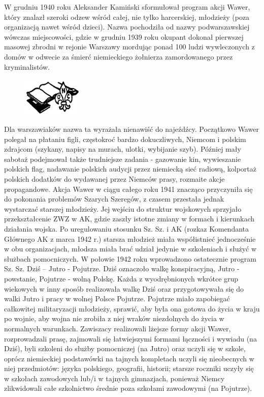 W grudniu 1940 roku Aleksander Kamiński sformułował program akcji Wawer, który znalazł szeroki odzew wśród całej, nie tylko harcerskiej, młodzieży (poza organizacją nawet wśród dzieci). 
Nazwa pochodziła od nazwy podwarszawskiej wówczas miejscowości, gdzie w grudniu 1939 roku okupant dokonał pierwszej masowej zbrodni w rejonie Warszawy mordując ponad 100 ludzi wywleczonych z domów w odwecie za śmierć niemieckiego żołnierza zamordowanego przez kryminalistów. 
\begin{figure}
  \begin{center}
    \includegraphics[width=2.9cm]{grafiki/onc.png}
  \end{center}
\end{figure}Dla warszawiaków nazwa ta wyrażała nienawiść do najeźdźcy. Początkowo Wawer polegał na płataniu figli, częstokroć bardzo dokuczliwych, Niemcom i polskim zdrajcom (szykany, napisy na murach, ulotki, wybijanie szyb). Później mały sabotaż podejmował także trudniejsze zadania - gazowanie kin, wywieszanie polskich flag, nadawanie polskich audycji przez niemiecką sieć radiową, kolportaż polskich dodatków do wydawanej przez Niemców prasy, rozmaite akcje propagandowe. Akcja Wawer w ciągu całego roku 1941 znacząco przyczyniła się do pokonania problemów Szarych Szeregów, z czasem przestała jednak wystarczać starszej młodzieży. Jej wejściu do struktur wojskowych sprzyjało przekształcenie ZWZ w AK, gdzie zaszły istotne zmiany w formach i kierunkach działania wojska. Po uregulowaniu stosunku Sz. Sz. i AK (rozkaz Komendanta Głównego AK z marca 1942 r.) starsza młodzież miała współistnieć jednocześnie w obu organizacjach, młodsza miała brać udział jedynie w szkoleniach i służyć w służbach pomocniczych. W połowie 1942 roku wprowadzono ostatecznie program Sz. Sz. Dziś – Jutro - Pojutrze. Dziś oznaczoło walkę konspiracyjną, Jutro - powstanie, Pojutrze - wolną Polskę. Każda z wyodrębnionych wkrótce grup wiekowych w inny sposób realizowała walkę Dziś oraz przygotowywała się do walki Jutro i pracy w wolnej Polsce Pojutrze. Pojutrze miało zapobiegać całkowitej militaryzacji młodzieży, sprawić, aby była ona gotowa do życia w kraju po wojnie, aby wojna nie zrobiła z niej wraków niezdolnych do życia w normalnych warunkach. Zawiszacy realizowali lżejsze formy akcji Wawer, rozprowadzali prasę, zajmowali się łatwiejszymi formami łączności i wywiadu (na Dziś), byli szkoleni do służby pomocniczej (na Jutro) oraz uczyli się w szkole, oprócz niemieckiej podstawówki na tajnych kompletach uczyli się nieobecnych w niej przedmiotów: języka polskiego, geografii, historii; starsze roczniki uczyły się w szkołach zawodowych lub/i w tajnych gimnazjach, ponieważ Niemcy zlikwidowali całe szkolnictwo średnie poza szkołami zawodowymi (na Pojutrze).
